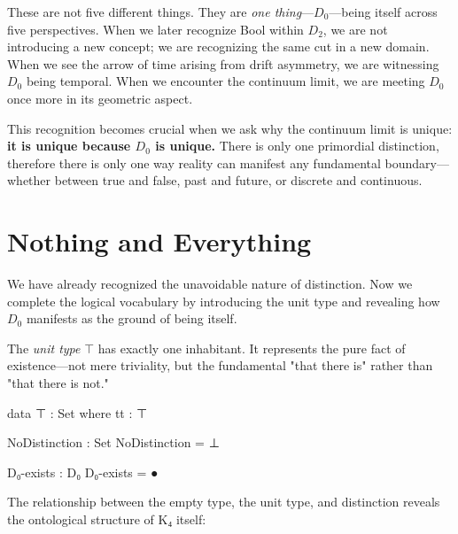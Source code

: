\documentclass[11pt,a4paper]{book}
\begin{document}
These are not five different things. They are \emph{one thing}—$D_0$—being itself 
across five perspectives. When we later recognize Bool within $D_2$, we are not introducing 
a new concept; we are recognizing the same cut in a new domain. When we see the arrow of 
time arising from drift asymmetry, we are witnessing $D_0$ being temporal. When we 
encounter the continuum limit, we are meeting $D_0$ once more in its geometric aspect.

This recognition becomes crucial when we ask why the continuum limit is unique: 
\textbf{it is unique because $D_0$ is unique.} There is only one primordial distinction, 
therefore there is only one way reality can manifest any fundamental boundary—whether 
between true and false, past and future, or discrete and continuous.

\chapter{Nothing and Everything}

We have already recognized the unavoidable nature of distinction. Now we complete 
the logical vocabulary by introducing the unit type and revealing how $D_0$ 
manifests as the ground of being itself.

The \emph{unit type} $\top$ has exactly one inhabitant. It represents 
the pure fact of existence—not mere triviality, but the fundamental "that there is" 
rather than "that there is not."

\begin{code}
data ⊤ : Set where
  tt : ⊤

NoDistinction : Set
NoDistinction = ⊥

D₀-exists : D₀
D₀-exists = ●
\end{code}

The relationship between the empty type, the unit type, and distinction 
reveals the ontological structure of K₄ itself:

\begin{center}
\end{center}
\end{document}
